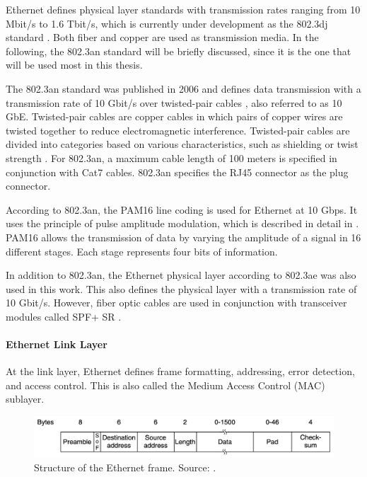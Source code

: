 Ethernet defines physical layer standards with transmission rates ranging from 10 Mbit/s to 1.6 Tbit/s, which is currently under development as the 802.3dj standard \cite{IEEEOpeningPlenary}. Both fiber and copper are used as transmission media. In the following, the 802.3an standard will be briefly discussed, since it is the one that will be used most in this thesis.

The 802.3an standard was published in 2006 and defines data transmission with a transmission rate of 10 Gbit/s over twisted-pair cables \cite{10GigabitEthernet}, also referred to as 10 GbE. Twisted-pair cables are copper cables in which pairs of copper wires are twisted together to reduce electromagnetic interference. Twisted-pair cables are divided into categories based on various characteristics, such as shielding or twist strength \cite{isoiec11801}. For 802.3an, a maximum cable length of 100 meters is specified in conjunction with Cat7 cables. 802.3an specifies the RJ45 connector as the plug connector.

According to 802.3an, the PAM16 line coding is used for Ethernet at 10 Gbps. It uses the principle of pulse amplitude modulation, which is described in detail in \cite{PulseAmplitudeModulation}. PAM16 allows the transmission of data by varying the amplitude of a signal in 16 different stages. Each stage represents four bits of information.

In addition to 802.3an, the Ethernet physical layer according to 802.3ae was also used in this work. This also defines the physical layer with a transmission rate of 10 Gbit/s. However, fiber optic cables are used in conjunction with transceiver modules called SPF+ SR \cite{10GigabitEthernet}.

\paragraph{Ethernet Link Layer} \label{chap:EthLinkLayer}
At the link layer, Ethernet defines frame formatting, addressing, error detection, and access control. This is also called the Medium Access Control (MAC) sublayer.

\begin{figure}[h]
    \centering
    \includegraphics[width=1\linewidth]{figures/tcpip_refmodel/image5.png}
    \caption[Structure of the Ethernet frame]{Structure of the Ethernet frame. Source: \cite{Tanenbaum2010}.}
    \label{fig:EthernetFrame}
\end{figure}

